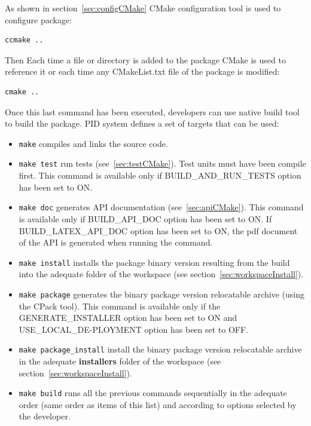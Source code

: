 \documentclass[12pt,a4paper]{article}
\begin{document}
As shown in section~\ref{sec:configCMake} CMake configuration tool is used to configure package: 
\begin{verbatim}
ccmake ..
\end{verbatim}

Then Each time a file or directory is added to the package CMake is used to reference it or each time any CMakeList.txt file of the package is modified:
\begin{verbatim}
cmake ..
\end{verbatim}

Once this last command has been executed, developers can use native build tool to build the package. PID system defines a set of targets that can be used:
\begin{itemize}
\item \texttt{make} compiles and links the source code.
\item \texttt{make test} run tests (see~\ref{sec:testCMake}). Test units must have been compile first. This command is available only if BUILD\_AND\_RUN\_TESTS option has been set to ON.
\item \texttt{make doc} generates API documentation (see~\ref{sec:apiCMake}). This command is available only if BUILD\_API\_DOC option has been set to ON. If BUILD\_LATEX\_API\_DOC option has been set to ON, the pdf document of the API is generated when running the command.
\item \texttt{make install} installs the package binary version resulting from the build into the adequate folder of the workspace (see section~\ref{sec:workspaceInstall}).
\item \texttt{make package} generates the binary package version relocatable archive (using the CPack tool). This command is available only if the GENERATE\_INSTALLER option has been set to ON and USE\_LOCAL\_DE-PLOYMENT option has been set to OFF.
\item \texttt{make package\_install} install the binary package version relocatable archive in the adequate \textbf{installers} folder of the workspace (see section~\ref{sec:workspaceInstall}).
\item \texttt{make build} runs all the previous commands sequentially in the adequate order (same order as items of this list) and according to options selected by the developer.
\end{itemize}
\end{document}
